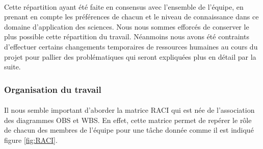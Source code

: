         \paragraph{}
        Cette répartition ayant été faite en consensus avec l'ensemble de l'équipe, en prenant en compte les préférences de chacun et le niveau de connaissance dans ce domaine d'application des sciences. Nous nous sommes efforcés de conserver le plus possible cette répartition du travail. Néanmoins nous avons été contraints d'effectuer certains changements temporaires de ressources humaines au cours du projet pour pallier des problématiques qui seront expliquées plus en détail par la suite.

    \subsubsection{Organisation du travail}
        \paragraph{}
        Il nous semble important d'aborder la matrice RACI qui est née de l'association des diagrammes OBS et WBS. En effet, cette matrice permet de repérer le rôle de chacun des membres de l'équipe pour une tâche donnée comme il est indiqué figure \ref{fig:RACI}.

